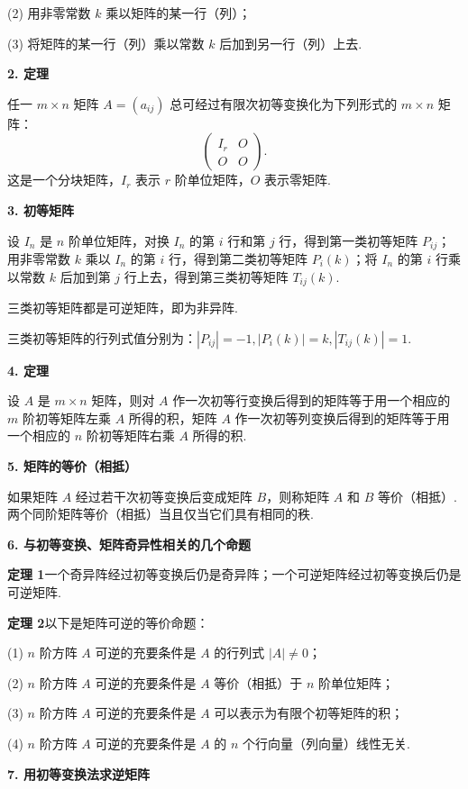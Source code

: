 \documentclass[UTF8,12pt,a4paper,fontset=fandol]{ctexart}
\begin{document}
(2) 用非零常数 $k$ 乘以矩阵的某一行（列）；

(3) 将矩阵的某一行（列）乘以常数 $k$ 后加到另一行（列）上去.

\noindent\textbf{2. 定理}

任一 $m\times n$ 矩阵 $A=(a_{ij})$ 总可经过有限次初等变换化为下列形式的 $m\times n$ 矩阵：
\[
\left(
\begin{array}{cc}
I_r & O\\
O & O
\end{array}
\right).
\]
这是一个分块矩阵，$I_r$ 表示 $r$ 阶单位矩阵，$O$ 表示零矩阵.

\noindent\textbf{3. 初等矩阵}

设 $I_n$ 是 $n$ 阶单位矩阵，对换 $I_n$ 的第 $i$ 行和第 $j$ 行，得到第一类初等矩阵 $P_{ij}$；用非零常数 $k$ 乘以 $I_n$ 的第 $i$ 行，得到第二类初等矩阵 $P_i(k)$；将 $I_n$ 的第 $i$ 行乘以常数 $k$ 后加到第 $j$ 行上去，得到第三类初等矩阵 $T_{ij}(k)$.

三类初等矩阵都是可逆矩阵，即为非异阵.

三类初等矩阵的行列式值分别为：$|P_{ij}|=-1, |P_i(k)|=k, |T_{ij}(k)|=1$.

\noindent\textbf{4. 定理}

设 $A$ 是 $m\times n$ 矩阵，则对 $A$ 作一次初等行变换后得到的矩阵等于用一个相应的 $m$ 阶初等矩阵左乘 $A$ 所得的积，矩阵 $A$ 作一次初等列变换后得到的矩阵等于用一个相应的 $n$ 阶初等矩阵右乘 $A$ 所得的积.

\noindent\textbf{5. 矩阵的等价（相抵）}

如果矩阵 $A$ 经过若干次初等变换后变成矩阵 $B$，则称矩阵 $A$ 和 $B$ 等价（相抵）. 两个同阶矩阵等价（相抵）当且仅当它们具有相同的秩.

\noindent\textbf{6. 与初等变换、矩阵奇异性相关的几个命题}

\noindent\textbf{定理 1}\quad 一个奇异阵经过初等变换后仍是奇异阵；一个可逆矩阵经过初等变换后仍是可逆矩阵.

\noindent\textbf{定理 2}\quad 以下是矩阵可逆的等价命题：

(1) $n$ 阶方阵 $A$ 可逆的充要条件是 $A$ 的行列式 $|A|\ne0$；

(2) $n$ 阶方阵 $A$ 可逆的充要条件是 $A$ 等价（相抵）于 $n$ 阶单位矩阵；

(3) $n$ 阶方阵 $A$ 可逆的充要条件是 $A$ 可以表示为有限个初等矩阵的积；

(4) $n$ 阶方阵 $A$ 可逆的充要条件是 $A$ 的 $n$ 个行向量（列向量）线性无关.

\noindent\textbf{7. 用初等变换法求逆矩阵}
\end{document}
